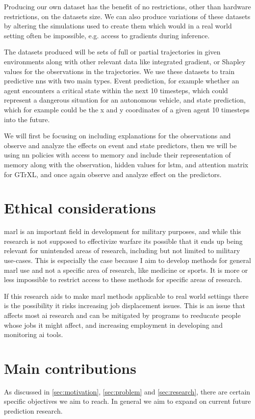 \documentclass[UKenglish]{uiomasterthesis}
\begin{document}
Producing our own dataset has the benefit of no restrictions, other than hardware restrictions, on the datasets size. We can also produce variations of these datasets by altering the simulations used to create them which would in a real world setting often be impossible, e.g. access to gradients during inference.

The datasets produced will be sets of full or partial trajectories in given environments along with other relevant data like integrated gradient, or Shapley values for the observations in the trajectories. We use these datasets to train predictive \acp{nn} with two main types. Event prediction, for example whether an agent encounters a critical state within the next 10 timesteps, which could represent a dangerous situation for an autonomous vehicle, and state prediction, which for example could be the x and y coordinates of a given agent 10 timesteps into the future.

We will first be focusing on including explanations for the observations and observe and analyze the effects on event and state predictors, then we will be using \ac{nn} policies with access to memory and include their representation of memory along with the observation, hidden values for lstm, and attention matrix for GTrXL, and once again observe and analyze effect on the predictors.

\section{Ethical considerations}
\ac{marl} is an important field in development for military purposes\cite{military_marl}, and while this research is not supposed to effectivize warfare its possible that it ends up being relevant for unintended areas of research, including but not limited to military use-cases. This is especially the case because I aim to develop methods for general \ac{marl} use and not a specific area of research, like medicine or sports. It is more or less impossible to restrict access to these methods for specific areas of research.

If this research aids to make \ac{marl} methods applicable to real world settings there is the possibility it risks increasing job displacement issues. This is an issue that affects most \ac{ai} research and can be mitigated by programs to reeducate people whose jobs it might affect, and increasing employment in developing and monitoring \ac{ai} tools.


\section{Main contributions}
As discussed in \ref{sec:motivation}, \ref{sec:problem} and \ref{sec:research}, there are certain specific objectives we aim to reach. In general we aim to expand on current future prediction research.
\end{document}
